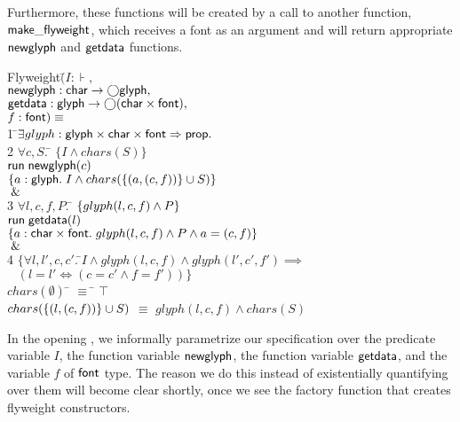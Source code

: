 Furthermore, these functions will be created by a call to another
function, $\mathsf{make\_flyweight}$, which receives a font as an
argument and will return appropriate $\mathsf{newglyph}$ and
$\mathsf{getdata}$ functions.

\begin{tabbing}
Flyweight$($\=$I : \assert,\;\; $\\
\> $\mathsf{newglyph} : \mathsf{char} \to \bigcirc{\mathsf{glyph}},$ \\
\> $\mathsf{getdata} : \mathsf{glyph} \to \bigcirc{(\mathsf{char}\times \mathsf{font})},$ \\
\> $f:\mathsf{font}) \equiv$ \\
1 \qquad \=$\exists $\=$glyph : \mathsf{glyph} \times \mathsf{char} \times \mathsf{font} \Rightarrow \mathsf{prop}.$ 
\\[0.5em]

2  \> \> $\forall c, S.\;$\=
         $\{I \land chars(S)\}$ \\
   \>\>\>$\mathsf{run}\;{\mathsf{newglyph}(c)}$ \\
   \>\>\>$\{{a:\mathsf{glyph}.\; 
                 I \land chars(\{{(a, (c,f))}\} \cup S)}\}$ \\
  \> \!$\;\&\;$ \\
3 \> $\forall l, c, f, P.\;$\=
     $\{{glyph(l, c, f) \land P}\}$ \\
\>\> $\mathsf{run}\;{\mathsf{getdata}(l)}$ \\
\>\> $\{{a:\mathsf{char} \times \mathsf{font}.\; glyph(l, c, f) \land P \land a = (c,f)}\}$
\\
  \> \!$\;\&\;$ \\
4 \> $\{\forall l, l', c, c'.\;$\=$I \land glyph(l,c,f) \land glyph(l',c',f')
 \implies $ \\
\>\>  $\;\;\;\left(l = l' \iff (c = c'\land f=f')\right)\}$ \\[0.5em]

$chars(\emptyset)$ \qquad\qquad\qquad \;\;\= $\equiv$ \= $\top$ \\
$chars(\{{(l,(c,f))}\} \cup S)$ \> $\equiv$ \> $glyph(l,c,f) \land chars(S)$ \\
\end{tabbing}


In the opening , we informally parametrize our specification over the
predicate variable $I$, the function variable $\mathsf{newglyph}$, the
function variable $\mathsf{getdata}$, and the variable $f$ of $\mathsf{font}$
type. The reason we do this instead of existentially quantifying over
them will become clear shortly, once we see the factory function that
creates flyweight constructors.

